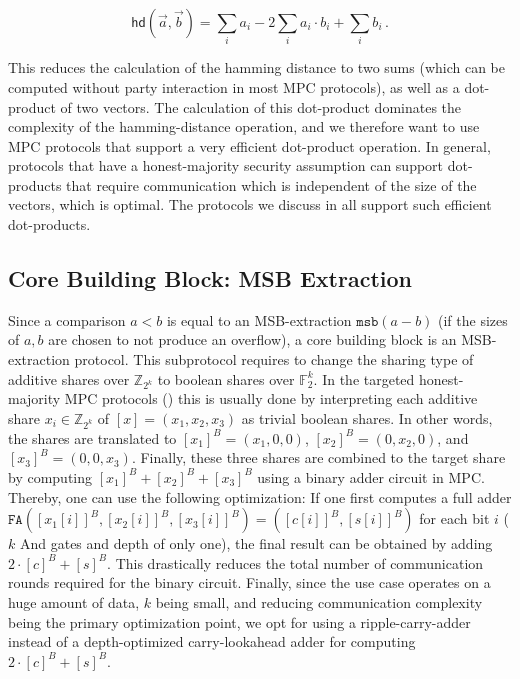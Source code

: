 \documentclass[a4paper,11pt,
]{article}
\newcommand{\F}{\ensuremath{\mathbb{F}}\xspace}
\newcommand{\Z}{\ensuremath{\mathbb{Z}}\xspace}
\newcommand{\shared}[1]{\ensuremath{[{#1}]}}
\newcommand{\sharedB}[1]{\ensuremath{[{#1}]^B}}
\begin{document}
\[
    \mathsf{hd}(\vec{a}, \vec{b}) = \sum_i a_i - 2\sum_i a_i \cdot b_i + \sum_i b_i\,.
\]

This reduces the calculation of the hamming distance to two sums (which can be computed without party interaction in most MPC protocols), as well as a dot-product of two vectors.
The calculation of this dot-product dominates the complexity of the hamming-distance operation, and we therefore want to use MPC protocols that support a very efficient dot-product operation.
In general, protocols that have a honest-majority security assumption can support dot-products that require communication which is independent of the size of the vectors, which is optimal.
The protocols we discuss in  all support such efficient dot-products.

\subsection{Core Building Block: MSB Extraction} \label{sec:a2b}

Since a comparison $a < b$ is equal to an MSB-extraction $\texttt{msb}(a-b)$ (if the sizes of $a,b$ are chosen to not produce an overflow), a core building block is an MSB-extraction protocol. This subprotocol requires to change the sharing type of additive shares over $\Z_{2^k}$ to boolean shares over $\F_2^k$. In the targeted honest-majority MPC protocols () this is usually done by interpreting each additive share $x_i \in \Z_{2^k}$ of $\shared{x}=(x_1, x_2, x_3)$ as trivial boolean shares. In other words, the shares are translated to $\sharedB{x_1} = (x_1, 0, 0)$, $\sharedB{x_2} = (0, x_2, 0)$, and $\sharedB{x_3} = (0, 0, x_3)$. Finally, these three shares are  combined to the target share by computing $\sharedB{x_1} + \sharedB{x_2} + \sharedB{x_3}$ using a binary adder circuit in MPC. Thereby, one can use the following optimization: If one first computes a full adder $\texttt{FA}(\sharedB{x_1[i]}, \sharedB{x_2[i]}, \sharedB{x_3[i]}) = (\sharedB{c[i]}, \sharedB{s[i]})$ for each bit $i$ ($k$ And gates and depth of only one), the final result can be obtained by adding $2 \cdot \sharedB{c} + \sharedB{s}$. This drastically reduces the total number of communication rounds required for the binary circuit.
Finally, since the use case operates on a huge amount of data, $k$ being small, and reducing communication complexity being the primary optimization point, we opt for using a ripple-carry-adder instead of a depth-optimized carry-lookahead adder for computing $2 \cdot \sharedB{c} + \sharedB{s}$.
\end{document}
